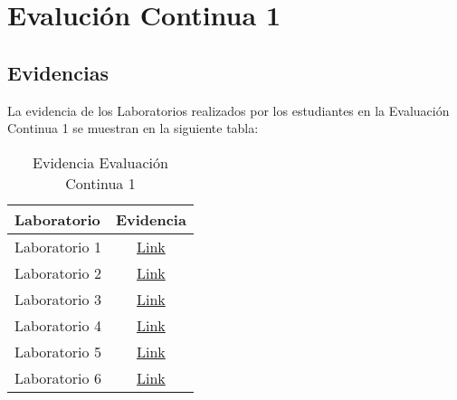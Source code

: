 \chapter{Evalución Continua 1}
\newpage


\pagestyle{empty} %

\section{Evidencias}
La evidencia de los Laboratorios realizados por los estudiantes en la Evaluación Continua 1 se muestran en la siguiente tabla:

\begin{table}[h]
\centering
\begin{tabular}{l|c}
\hline
\textbf{Laboratorio} & 
\textbf{Evidencia} 
\\ \hline
Laboratorio 1 &
\href{https://drive.google.com/open?id=14bUBsi5mWcXdS7T6exKaAuNErO6ghBht}{Link}
\\ \hline
Laboratorio 2 &
\href{https://drive.google.com/open?id=18ME0C-p_CZaEEWIDGRZS0E8kqWfivRzz}{Link}
\\ \hline
Laboratorio 3 &
\href{https://drive.google.com/open?id=1EaewLSz7uR3Yes-7xTqEYHubzUO-OvRo}{Link}
\\ \hline
Laboratorio 4 &
\href{https://drive.google.com/open?id=1AyoTRNG5cdVN_4KT6GYTrjZeZNXVxDkp}{Link}
\\ \hline
Laboratorio 5 &
\href{https://drive.google.com/open?id=1m_iLv_y333cEQlWQcaO8i-b-9oErs1Pk}{Link}
\\ \hline
Laboratorio 6 &
\href{https://drive.google.com/open?id=1eLiCzuqyqpY3-19iIoFaPkuCp1v_OFaN}{Link}
\\ \hline
\end{tabular}
\caption{Evidencia Evaluación Continua 1}
\label{tab:evidencia_evaluacion_continua_1} %
\end{table}

